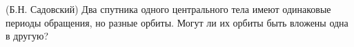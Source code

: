 (Б.Н. Садовский)
Два спутника одного центрального тела имеют одинаковые периоды
обращения, но разные орбиты. Могут ли их орбиты быть вложены одна в
другую?
